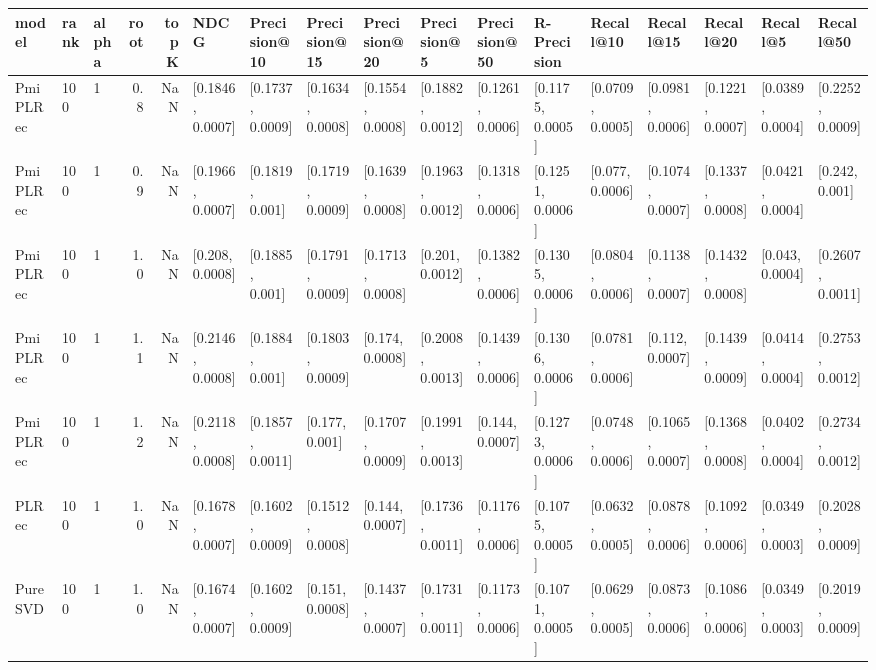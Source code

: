 \begin{tabular}{lllrrllllllllllll}
\toprule
     model & rank & alpha &  root &  topK &              NDCG &      Precision@10 &      Precision@15 &      Precision@20 &       Precision@5 &      Precision@50 &       R-Precision &         Recall@10 &         Recall@15 &         Recall@20 &          Recall@5 &         Recall@50 \\
\midrule
  PmiPLRec &  100 &     1 &   0.8 &   NaN &  [0.1846, 0.0007] &  [0.1737, 0.0009] &  [0.1634, 0.0008] &  [0.1554, 0.0008] &  [0.1882, 0.0012] &  [0.1261, 0.0006] &  [0.1175, 0.0005] &  [0.0709, 0.0005] &  [0.0981, 0.0006] &  [0.1221, 0.0007] &  [0.0389, 0.0004] &  [0.2252, 0.0009] \\
  PmiPLRec &  100 &     1 &   0.9 &   NaN &  [0.1966, 0.0007] &   [0.1819, 0.001] &  [0.1719, 0.0009] &  [0.1639, 0.0008] &  [0.1963, 0.0012] &  [0.1318, 0.0006] &  [0.1251, 0.0006] &   [0.077, 0.0006] &  [0.1074, 0.0007] &  [0.1337, 0.0008] &  [0.0421, 0.0004] &    [0.242, 0.001] \\
  PmiPLRec &  100 &     1 &   1.0 &   NaN &   [0.208, 0.0008] &   [0.1885, 0.001] &  [0.1791, 0.0009] &  [0.1713, 0.0008] &   [0.201, 0.0012] &  [0.1382, 0.0006] &  [0.1305, 0.0006] &  [0.0804, 0.0006] &  [0.1138, 0.0007] &  [0.1432, 0.0008] &   [0.043, 0.0004] &  [0.2607, 0.0011] \\
  PmiPLRec &  100 &     1 &   1.1 &   NaN &  [0.2146, 0.0008] &   [0.1884, 0.001] &  [0.1803, 0.0009] &   [0.174, 0.0008] &  [0.2008, 0.0013] &  [0.1439, 0.0006] &  [0.1306, 0.0006] &  [0.0781, 0.0006] &   [0.112, 0.0007] &  [0.1439, 0.0009] &  [0.0414, 0.0004] &  [0.2753, 0.0012] \\
  PmiPLRec &  100 &     1 &   1.2 &   NaN &  [0.2118, 0.0008] &  [0.1857, 0.0011] &    [0.177, 0.001] &  [0.1707, 0.0009] &  [0.1991, 0.0013] &   [0.144, 0.0007] &  [0.1273, 0.0006] &  [0.0748, 0.0006] &  [0.1065, 0.0007] &  [0.1368, 0.0008] &  [0.0402, 0.0004] &  [0.2734, 0.0012] \\
     PLRec &  100 &     1 &   1.0 &   NaN &  [0.1678, 0.0007] &  [0.1602, 0.0009] &  [0.1512, 0.0008] &   [0.144, 0.0007] &  [0.1736, 0.0011] &  [0.1176, 0.0006] &  [0.1075, 0.0005] &  [0.0632, 0.0005] &  [0.0878, 0.0006] &  [0.1092, 0.0006] &  [0.0349, 0.0003] &  [0.2028, 0.0009] \\
   PureSVD &  100 &     1 &   1.0 &   NaN &  [0.1674, 0.0007] &  [0.1602, 0.0009] &   [0.151, 0.0008] &  [0.1437, 0.0007] &  [0.1731, 0.0011] &  [0.1173, 0.0006] &  [0.1071, 0.0005] &  [0.0629, 0.0005] &  [0.0873, 0.0006] &  [0.1086, 0.0006] &  [0.0349, 0.0003] &  [0.2019, 0.0009] \\

\end{tabular}
